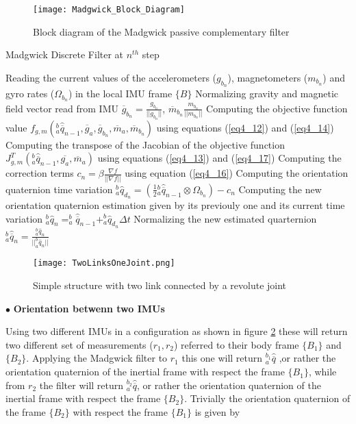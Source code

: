 \begin{figure}[t]
\texttt{[image: Madgwick\_Block\_Diagram]}
\caption{Block diagram of the Madgwick passive complementary filter}
\label{BlockDiagram} 
\end{figure}

\begin{algorithm}
\caption{Madgwick Discrete Filter at $n^{th}$ step}
\begin{algorithmic}[1]
\label{MadgwickAlg}
\STATE Reading the current values of the accelerometers ($g_{b_n}$), magnetometers ($m_{b_n}$) and gyro rates ($\Omega_{b_n}$) in the local IMU frame $\{B\}$
\STATE Normalizing gravity and magnetic field vector read from IMU $\overline{g}_{b_n} = \frac{g_{b_n}}{\vert \vert g_{b_n} \vert \vert}$, $\overline{m}_{b_n} \frac{m_{b_n}}{\vert \vert m_{b_n} \vert \vert}$
\STATE Computing the objective function value $f_{g,m}({^b_a\hat{\overline{q}}_{n-1}},\overline{g}_a,\overline{g}_{b_n},\overline{m}_a,\overline{m}_{b_n})$ using equations (\ref{eq4_12}) and (\ref{eq4_14})
\STATE Computing the transpose of the Jacobian of the objective function $J^T_{g,m}(^b_a\hat{\overline{q}}_{n-1},\overline{g_a},\overline{m}_a)$ using equations (\ref{eq4_13}) and (\ref{eq4_17})
\STATE Computing the correction terms $c_n =  \beta \frac{\nabla f}{\vert \vert \nabla f \vert \vert}$ using equation (\ref{eq4_16})
\STATE Computing the orientation quaternion time variation $^b_a \hat{q}_{d_n} =  (\frac{1}{2} {^b_a\hat{\overline{q}}_{n-1}} \otimes \Omega_{b_n}) - c_n$
\STATE Computing the new orientation quaternion estimation given by its previouly one and its current time variation $^b_a \hat{q}_n = ^b_a\hat{\overline{q}}_{n-1} + ^b_a \hat{q}_{d_n} \Delta t$
\STATE Normalizing the new estimated quarternion $^b_a \hat{\overline{q}}_n = \frac{^b_a \hat{q}_n}{\vert \vert ^b_a \hat{q}_n \vert \vert}$ 
\end{algorithmic}
\end{algorithm}

\begin{figure}[t]
\centering
\texttt{[image: TwoLinksOneJoint.png]}
\caption{Simple structure with two link connected by a revolute joint}
\label{TwoLinksOneJoint}
\end{figure}

\noindent $\bullet$ \textbf{Orientation betwenn two IMUs}

Using two different IMUs in a configuration as shown in figure \ref{TwoLinksOneJoint} these will return two different set of measurements ($r_1,r_2$) referred to their body frame $\{ B_1 \}$ and $\{ B_2 \}$. Applying the Madgwick filter to $r_1$ this one will return $^{b{_1}}_a \hat{\overline{q}}$ ,or rather the orientation quaternion of the inertial frame with respect the frame $\{ B_1 \}$, while from $r_2$ the filter will return $^{b{_2}}_a \hat{\overline{q}}$, or rather the orientation quaternion of the inertial frame with respect the frame $\{ B_2 \}$. Trivially the orientation quaternion of the frame $\{ B_2 \}$ with respect the frame $\{ B_1 \}$ is given by



